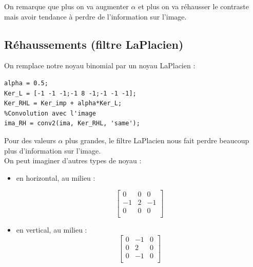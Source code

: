 \documentclass{article}
\begin{document}
\begin{enumerate}[label=\arabic*$\degres$)]
On remarque que plus on va augmenter $\alpha$ et plus on va réhausser le contraste mais avoir tendance à perdre de l'information sur l'image.
\subsection*{Réhaussements (filtre LaPlacien)}
On remplace notre noyau binomial par un noyau LaPlacien :
\begin{lstlisting}
alpha = 0.5;
Ker_L = [-1 -1 -1;-1 8 -1;-1 -1 -1]; 
Ker_RHL = Ker_imp + alpha*Ker_L;
%Convolution avec l'image
ima_RH = conv2(ima, Ker_RHL, 'same'); 
\end{lstlisting}

\begin{minipage}[b]{0.40\linewidth}
	\end{minipage}\hfill
	\begin{minipage}[b]{0.48\linewidth}
	\end{minipage}\hfill

Pour des valeurs $\alpha$ plus grandes, le filtre LaPlacien nous fait perdre beaucoup plus d'information sur l'image.\\

On peut imaginer d'autres types de noyau :\\
	\begin{itemize}
	\item en horizontal, au milieu :

\[	
\begin{bmatrix}
0 & 0 & 0\\
-1 & 2 & -1\\
0 & 0 & 0\\
\end{bmatrix}
\]
	\item en vertical, au milieu :
\[
\begin{bmatrix}
0 & -1 & 0\\
0 & 2 & 0\\
0 & -1 & 0\\
\end{bmatrix}
\]


\end{itemize}
\end{enumerate}
\end{document}
